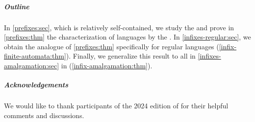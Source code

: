\subparagraph{Outline} In
\cref{prefixes:sec}, which is relatively
self-contained, we study the  and prove in
\cref{prefixes:thm} the characterization of 
languages by the . In
\cref{infixes-regular:sec}, we
obtain the  analogue of \cref{prefixes:thm}
specifically for regular languages
(\cref{infix-finite-automata:thm}). Finally, we generalize this result to all
 in \cref{infixes-amalgamation:sec}
in
(\cref{infix-amalgamation:thm}).

\subparagraph{Acknowledgements} We would like to thank participants of the 2024
edition of  for their helpful comments and discussions.

